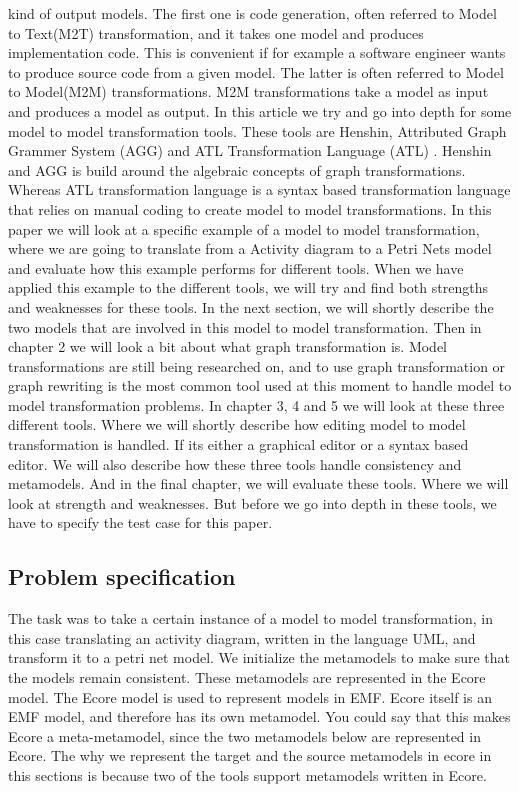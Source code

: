 \documentclass[pdftex,11pt,a4paper]{article}
\begin{document}
kind of output models. The first one is code generation, often referred to
Model to Text(M2T) transformation, and it takes one model and produces
implementation code. This is convenient if for example a software engineer
wants to produce source code from a given model. The latter is often referred
to Model to Model(M2M) transformations. M2M transformations take a model as
input and produces a model as output. In this article we try and go into depth
for some model to model transformation tools. These tools are
Henshin\cite{Henshin}, Attributed Graph Grammer System (AGG) \cite{AGG} and
ATL Transformation Language (ATL) \cite{ATL}. Henshin and AGG is build around
the algebraic concepts of graph transformations. Whereas ATL transformation
language is a syntax based transformation language that relies on manual coding
to create model to model transformations. In this paper we will look at a
specific example of a model to model transformation, where we are going to
translate from a Activity diagram to a Petri Nets model and evaluate how this
example performs for different tools. When we have applied this example to the
different tools, we will try and find both strengths and weaknesses for these
tools. In the next section, we will shortly describe the two models that are
involved in this model to model transformation. Then in chapter 2 we will look a
bit about what graph transformation is. Model transformations are still being
researched on, and to use graph transformation or graph rewriting is the
most common tool used at this moment to handle model to model transformation
problems. In chapter 3, 4 and 5 we will look at these three different tools.
Where we will shortly describe how editing model to model transformation is
handled. If its either a graphical editor or a syntax based editor. We will
also describe how these three tools handle consistency and metamodels. And in
the final chapter, we will evaluate these tools. Where we will look at strength
and weaknesses. But before we go into depth in these tools, we have to specify
the test case for this paper.

\subsection{Problem specification}
\noindent The task was to take a certain instance of a model to model
transformation, in this case translating an activity diagram, written in the
language UML, and transform it to a petri net model. We initialize the
metamodels to make sure that the models remain consistent. These metamodels are
represented in the Ecore model\cite{Steinberg2009}. The Ecore model is used to
represent models in EMF. Ecore itself is an EMF model, and therefore has its own
metamodel. You could say that this makes Ecore a meta-metamodel, since the two
metamodels below are represented in Ecore. The why we represent the target and
the source metamodels in ecore in this sections is because two of the tools
support metamodels written in Ecore.
\end{document}
